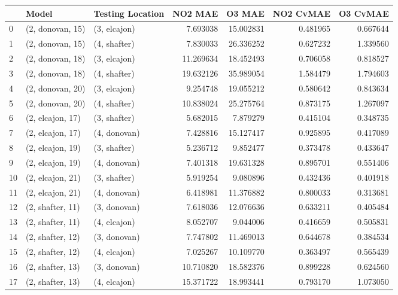 \begin{tabular}{lllrrrr}
\toprule
{} &             Model & Testing Location &    NO2 MAE &     O3 MAE &  NO2 CvMAE &  O3 CvMAE \\
\midrule
0  &  (2, donovan, 15) &     (3, elcajon) &   7.693038 &  15.002831 &   0.481965 &  0.667644 \\
1  &  (2, donovan, 15) &     (4, shafter) &   7.830033 &  26.336252 &   0.627232 &  1.339560 \\
2  &  (2, donovan, 18) &     (3, elcajon) &  11.269634 &  18.452493 &   0.706058 &  0.818527 \\
3  &  (2, donovan, 18) &     (4, shafter) &  19.632126 &  35.989054 &   1.584479 &  1.794603 \\
4  &  (2, donovan, 20) &     (3, elcajon) &   9.254748 &  19.055212 &   0.580642 &  0.843634 \\
5  &  (2, donovan, 20) &     (4, shafter) &  10.838024 &  25.275764 &   0.873175 &  1.267097 \\
6  &  (2, elcajon, 17) &     (3, shafter) &   5.682015 &   7.879279 &   0.415104 &  0.348735 \\
7  &  (2, elcajon, 17) &     (4, donovan) &   7.428816 &  15.127417 &   0.925895 &  0.417089 \\
8  &  (2, elcajon, 19) &     (3, shafter) &   5.236712 &   9.852477 &   0.373478 &  0.433647 \\
9  &  (2, elcajon, 19) &     (4, donovan) &   7.401318 &  19.631328 &   0.895701 &  0.551406 \\
10 &  (2, elcajon, 21) &     (3, shafter) &   5.919254 &   9.080896 &   0.432436 &  0.401918 \\
11 &  (2, elcajon, 21) &     (4, donovan) &   6.418981 &  11.376882 &   0.800033 &  0.313681 \\
12 &  (2, shafter, 11) &     (3, donovan) &   7.618036 &  12.076636 &   0.633211 &  0.405484 \\
13 &  (2, shafter, 11) &     (4, elcajon) &   8.052707 &   9.044006 &   0.416659 &  0.505831 \\
14 &  (2, shafter, 12) &     (3, donovan) &   7.747802 &  11.469013 &   0.644678 &  0.384534 \\
15 &  (2, shafter, 12) &     (4, elcajon) &   7.025267 &  10.109770 &   0.363497 &  0.565439 \\
16 &  (2, shafter, 13) &     (3, donovan) &  10.710820 &  18.582376 &   0.899228 &  0.624560 \\
17 &  (2, shafter, 13) &     (4, elcajon) &  15.371722 &  18.993441 &   0.793170 &  1.073050 \\

\end{tabular}
